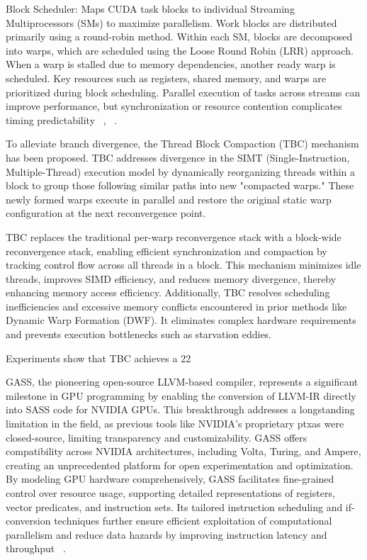 Block Scheduler: Maps CUDA task blocks to individual Streaming Multiprocessors (SMs) to maximize parallelism. Work blocks are distributed primarily using a round-robin method. Within each SM, blocks are decomposed into warps, which are scheduled using the Loose Round Robin (LRR) approach. When a warp is stalled due to memory dependencies, another ready warp is scheduled. Key resources such as registers, shared memory, and warps are prioritized during block scheduling.
Parallel execution of tasks across streams can improve performance, but synchronization or resource contention complicates timing predictability ~\cite{Bakhoda2009}, ~\cite{Sanudo2020}.

To alleviate branch divergence, the Thread Block Compaction (TBC) mechanism has been proposed. TBC addresses divergence in the SIMT (Single-Instruction, Multiple-Thread) execution model by dynamically reorganizing threads within a block to group those following similar paths into new "compacted warps." These newly formed warps execute in parallel and restore the original static warp configuration at the next reconvergence point.

TBC replaces the traditional per-warp reconvergence stack with a block-wide reconvergence stack, enabling efficient synchronization and compaction by tracking control flow across all threads in a block. This mechanism minimizes idle threads, improves SIMD efficiency, and reduces memory divergence, thereby enhancing memory access efficiency. Additionally, TBC resolves scheduling inefficiencies and excessive memory conflicts encountered in prior methods like Dynamic Warp Formation (DWF). It eliminates complex hardware requirements and prevents execution bottlenecks such as starvation eddies.

Experiments show that TBC achieves a 22%

GASS, the pioneering open-source LLVM-based compiler, represents a significant milestone in GPU programming by enabling the conversion of LLVM-IR directly into SASS code for NVIDIA GPUs. This breakthrough addresses a longstanding limitation in the field, as previous tools like NVIDIA's proprietary ptxas were closed-source, limiting transparency and customizability. GASS offers compatibility across NVIDIA architectures, including Volta, Turing, and Ampere, creating an unprecedented platform for open experimentation and optimization. By modeling GPU hardware comprehensively, GASS facilitates fine-grained control over resource usage, supporting detailed representations of registers, vector predicates, and instruction sets. Its tailored instruction scheduling and if-conversion techniques further ensure efficient exploitation of computational parallelism and reduce data hazards by improving instruction latency and throughput ~\cite{Yan2022}.

